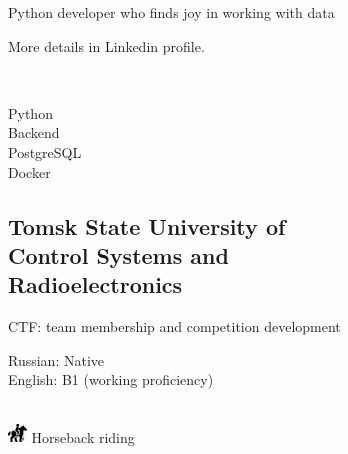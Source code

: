 \documentclass[a4paper]{MagicalCV}
\begin{document}
\lastupdated


\begin{minipage}[t]{0.33\textwidth} 


Python developer who finds joy in working with data

More details in Linkedin profile.
\sectionsep


\\


\sectionsep


\textbullet{}Python \\
\textbullet{}Backend \\
\textbullet{}PostgreSQL \\
\textbullet{}Docker \\


\subsection{Tomsk State University of \\ Control Systems and \\ Radioelectronics}
\vspace{\topsep} %
CTF: team membership and competition development
\sectionsep


Russian: Native\\
English: B1 (working proficiency)
\sectionsep

\\
\includegraphics[width=0.5cm]{horse_icon.png} Horseback riding
\sectionsep


\end{minipage} 
\end{document}
